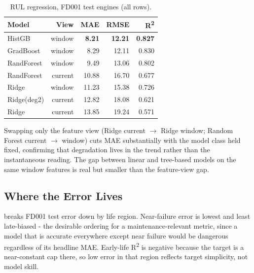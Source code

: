 \documentclass[9pt,a4paper,twocolumn,twoside]{rho-class/rho}
\begin{document}
        \begin{table}[H]
            \caption{RUL regression, FD001 test engines (all rows).}
            \label{tab:reg_fd001}
            \begin{tabular}{lrrrr}
            \toprule
            \textbf{Model} & \textbf{View} & \textbf{MAE} & \textbf{RMSE} & \textbf{R\textsuperscript{2}} \\
            \midrule
            HistGB     & window  & \textbf{8.21} & \textbf{12.21} & \textbf{0.827} \\
            GradBoost  & window  & 8.29 & 12.11 & 0.830 \\
            RandForest & window  & 9.49 & 13.06 & 0.802 \\
            RandForest & current & 10.88 & 16.70 & 0.677 \\
            Ridge      & window  & 11.23 & 15.38 & 0.726 \\
            Ridge(deg2)& current & 12.82 & 18.08 & 0.621 \\
            Ridge      & current & 13.85 & 19.24 & 0.571 \\
            \bottomrule
            \end{tabular}
        \end{table}

        Swapping only the feature view (Ridge current $\to$ Ridge window; Random Forest current $\to$ window) cuts MAE substantially with the model class held fixed, confirming that degradation lives in the trend rather than the instantaneous reading. The gap between linear and tree-based models on the same window features is real but smaller than the feature-view gap.

    \subsection{Where the Error Lives}

         breaks FD001 test error down by life region. Near-failure error is lowest and least late-biased - the desirable ordering for a maintenance-relevant metric, since a model that is accurate everywhere except near failure would be dangerous regardless of its headline MAE. Early-life R\textsuperscript{2} is negative because the target is a near-constant cap there, so low error in that region reflects target simplicity, not model skill.
\end{document}

